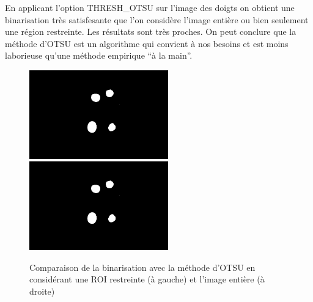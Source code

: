 En applicant l'option THRESH\_OTSU sur l'image des doigts on obtient une binarisation très satisfesante que l'on 
considère l'image entière ou bien seulement une région restreinte. Les résultats sont très proches. On peut conclure que la méthode d'OTSU est un 
algorithme qui convient à nos besoins et est moins laborieuse qu'une méthode empirique ``à la main''.

\begin{figure}[H]
      \center
      \includegraphics[width=6cm]{ressources/tp4/binarisation_OTSU_ROI.png}
      \includegraphics[width=6cm]{ressources/tp4/binarisation_OTSU.png}
      \caption{Comparaison de la binarisation avec la méthode d'OTSU en considérant une ROI restreinte (à gauche) et l'image entière (à droite)}
\end{figure}
